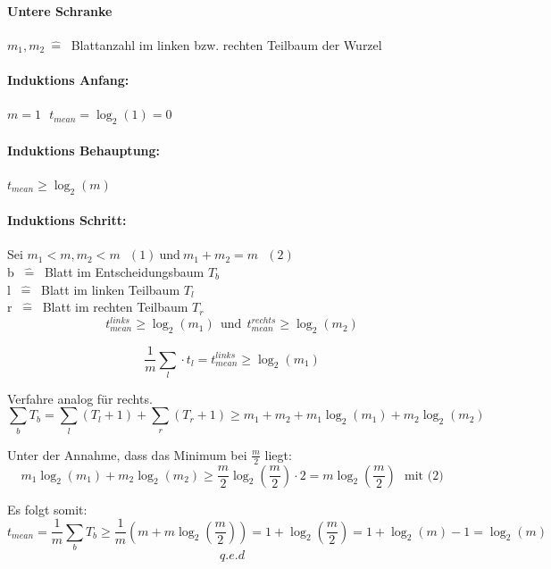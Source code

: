 \vspace{30pt}
\paragraph{Untere Schranke}
$m_1, m_2 ~\hat{=}~$ Blattanzahl im linken bzw. rechten Teilbaum der Wurzel
\vspace{100pt}

\paragraph{Induktions Anfang:} $m=1 ~~~ t_{mean} = \log_2(1)=0$

\paragraph{Induktions Behauptung:} $t_{mean} \geq \log_2(m)$

\paragraph{Induktions Schritt:} Sei $m_1 < m, m_2 < m ~~~(1) ~\text{und}~ m_1+m_2=m ~~~(2)$ \\

b $~\hat{=}~$ Blatt im Entscheidungsbaum $T_b$\\
l $~\hat{=}~$ Blatt im linken Teilbaum $T_l$\\
r $~\hat{=}~$ Blatt im rechten Teilbaum $T_r$\\

\[t^{links}_{mean} \geq \log_2(m_1) ~~\text{und}~~t^{rechts}_{mean} \geq \log_2(m_2)\]

\[\frac{1}{m} \sum_{l} \cdot t_l = t^{links}_{mean}  \geq \log_2(m_1) \]

Verfahre analog für rechts.\\

\[\sum_b T_b = \sum_l (T_l+1) + \sum_r (T_r+1) \geq m_1+m_2 + m_1 \log_2(m_1) + m_2 \log_2(m_2) \]

Unter der Annahme, dass das Minimum bei $\frac{m}{2}$ liegt:
\[m_1 \log_2(m_1) + m_2 \log_2(m_2) \geq \frac{m}{2} \log_2 \left(\frac{m}{2} \right) \cdot 2 = m \log_2 \left(\frac{m}{2} \right) ~~~\text{mit (2)} \] 

Es folgt somit: 
\[ t_{mean} = \frac{1}{m} \sum_b T_b \geq  \frac{1}{m}\left(m+m\log_2\left( \frac{m}{2}\right)\right) = 1+ \log_2\left( \frac{m}{2}\right) = 1+ \log_2(m) -1 = \log_2(m) \]
\[q.e.d\]

\newpage


